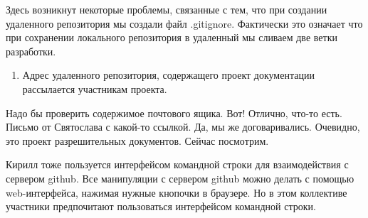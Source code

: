 \documentclass[14pt,a4paper]{article}
\begin{document}
{
{\normalfont Здесь возникнут некоторые проблемы, связанные с тем, что при создании 
удаленного репозитория мы создали файл .gitignore. Фактически это означает что 
при сохранении локального репозитория в удаленный мы сливаем две ветки разработки.}

  \begin{enumerate}[resume]
\item Адрес удаленного репозитория, содержащего проект документации рассылается участникам
проекта. 
\end{enumerate}
}

 Надо бы проверить содержимое почтового ящика. Вот! Отлично, что-то есть. 
Письмо от Святослава с какой-то ссылкой. Да, мы же договаривались. Очевидно, это проект
разрешительных документов. Сейчас посмотрим.

 Кирилл тоже пользуется интерфейсом командной строки для взаимодействия с сервером
github. Все манипуляции с сервером github можно делать с помощью web-интерфейса, нажимая
нужные кнопочки в браузере. Но в этом коллективе участники предпочитают пользоваться интерфейсом
командной строки. 

\end{document}
